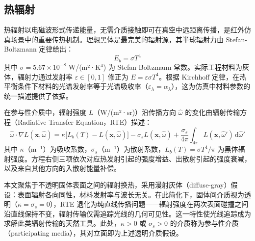 \subsection{热辐射}

热辐射以电磁波形式传递能量，无需介质接触即可在真空中远距离传播，是红外仿真场景中的重要传热机制。理想黑体是最完美的辐射源，其半球辐射力由 Stefan-Boltzmann 定律给出：
\begin{equation}
    E_b = \sigma T^4
\end{equation}
其中 $\sigma = 5.67 \times 10^{-8}$ W/(m²·K$^4$) 为 Stefan-Boltzmann 常数。实际工程材料为灰体，辐射力通过发射率 $\varepsilon \in [0,1]$ 修正为 $E = \varepsilon \sigma T^4$。根据 Kirchhoff 定律，在热平衡条件下材料的光谱发射率等于光谱吸收率（$\varepsilon_\lambda = \alpha_\lambda$），这为仿真中材料参数的统一描述提供了依据。

在参与性介质中，辐射强度 $L$（W/(m²·sr)）沿传播方向 $\hat{\omega}$ 的变化由辐射传输方程（Radiative Transfer Equation，RTE）描述：
\begin{equation}
    \hat{\omega} \cdot \nabla L(\mathbf{x}, \hat{\omega})
    = \kappa\bigl[L_b(T) - L(\mathbf{x}, \hat{\omega})\bigr]
    - \sigma_s L(\mathbf{x}, \hat{\omega})
    + \frac{\sigma_s}{4\pi} \int_{4\pi} L(\mathbf{x}, \hat{\omega}') \, \mathrm{d}\hat{\omega}'
    \label{eq:rte}
\end{equation}
其中 $\kappa$（m$^{-1}$）为吸收系数，$\sigma_s$（m$^{-1}$）为散射系数，$L_b(T) = \sigma T^4/\pi$ 为黑体辐射强度。方程右侧三项依次对应热发射引起的强度增益、出散射引起的强度衰减，以及来自其他方向的入散射能量补偿。

本文聚焦于不透明固体表面之间的辐射换热，采用漫射灰体（diffuse-gray）假设：表面辐射各向同性，材料发射率与波长无关。在此简化下，固体间介质视为透明（$\kappa = \sigma_s = 0$），RTE 退化为纯直线传播问题——辐射强度在两次表面碰撞之间沿直线保持不变，辐射传输仅需追踪光线的几何可见性。这一特性使光线追踪成为求解此类辐射传输的天然工具。此处，$\kappa > 0$ 或 $\sigma_s > 0$ 的介质称为参与性介质（participating media），其对立面即为上述透明介质假设。


